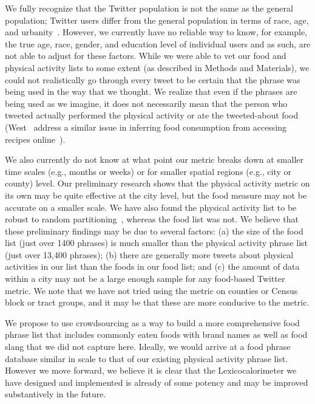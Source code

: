 We fully recognize
that the Twitter population is not the same as the general population;
Twitter users differ from the general population in terms of race,
age, and urbanity~\cite{pew}.  
However, we currently have no reliable
way to know, for example, the true age, race, gender, and education
level of individual users and as such, are not able to adjust for
these factors.  
While we were able to vet our food and physical
activity lists to some extent (as described in Methods and Materials), we could
not realistically go through every tweet to be certain that the phrase
was being used in the way that we thought.  
We realize that even if
the phrases are being used as we imagine, it does not necessarily mean
that the person who tweeted actually performed the physical activity
or ate the tweeted-about food (West \etal\ address a similar
issue in inferring food consumption from accessing recipes online~\cite{west2013}).

We also currently do not know at what point our metric breaks down at smaller
time scales (e.g., months or weeks) or for smaller spatial regions
(e.g., city or county) level.  Our preliminary research shows that the
physical activity metric on its own may be quite effective at the city
level, but the food measure may not be accurate on a smaller scale.
We have also found the physical activity list to be robust to random
partitioning~\cite{williams2014a}, whereas the food list was not.  
We believe that these preliminary findings may be due to several factors:
(a) the size of the food list (just over 1400 phrases) is much smaller
than the physical activity phrase list (just over 13,400 phrases); 
(b)
there are generally more tweets about physical activities in our
list than the foods in our food list; 
and (c) the amount of data
within a city may not be a large enough sample for any food-based
Twitter metric.
We note that we have not tried using the
metric on counties or Census block or tract groups, and it may be that
these are more conducive to the metric.

We propose to use crowdsourcing as a way to build a more comprehensive
food phrase list that includes commonly eaten foods with brand names
as well as food slang that we did not capture here.
Ideally, we would arrive at a food phrase database similar in
scale to that of our existing physical activity phrase list.
However we move forward, we believe it is clear that the 
 Lexicocalorimeter we have designed and implemented is already of some potency
and may be improved substantively in the future.

